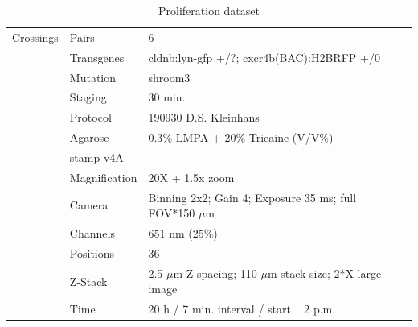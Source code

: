 \documentclass[11pt,singlespacinge,twoside]{reedthesis} %
\begin{document}
\begin{table}[!h]

\caption{\label{tab:imgdatprol}Proliferation dataset}
\centering
\begin{tabu} to 
\toprule
{}  Crossings & Pairs & 6\\
 & Transgenes & cldnb:lyn-gfp +/?; cxcr4b(BAC):H2BRFP +/0\\

   & Mutation & shroom3\\

 & Staging & 30 min.\\

   & Protocol & 190930 D.S. Kleinhans\\

 & Agarose & 0.3$\%$ LMPA + 20$\%$ Tricaine (V/V$\%$)\\

   & stamp v4A & \\

 & Magnification & 20X + 1.5x zoom\\

   & Camera & Binning 2x2; Gain 4; Exposure 35 ms; full FOV*150 $\mu$m\\

 & Channels & 651 nm (25$\%$)\\

   & Positions & 36\\

 & Z-Stack & 2.5 $\mu$m Z-spacing; 110 $\mu$m stack size; 2*X large image\\

   & Time & 20 h / 7 min. interval / start ~ 2 p.m.\\
\bottomrule
\end{tabu}
\end{table}
\end{document}
